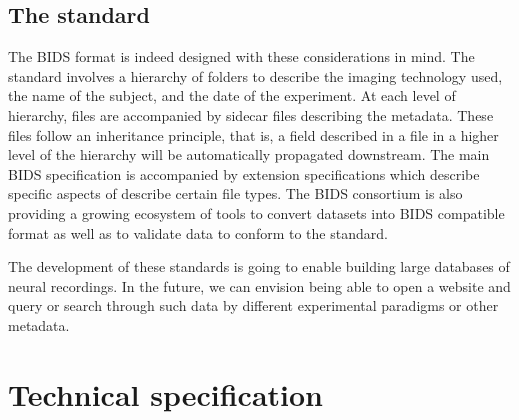 \subsection{The standard}
The BIDS format is indeed designed with these considerations in mind. The standard involves a hierarchy of folders to describe the imaging technology used, the name of the subject, and the date of the experiment. At each level of hierarchy, files are accompanied by sidecar  files describing the metadata. These files follow an inheritance principle, that is, a field described in a  file in a higher level of the hierarchy will be automatically propagated downstream. The main BIDS specification is accompanied by extension specifications which describe specific aspects of describe certain file types. The BIDS consortium is also providing a growing ecosystem of tools to convert datasets into BIDS compatible format as well as to validate data to conform to the standard. 

The development of these standards is going to enable building large databases of neural recordings. In the future, we can envision being able to open a website and query or search through such data by different experimental paradigms or other metadata.

\noindent{}%

\section{Technical specification}
\label{sec:BIDS-MEG}

